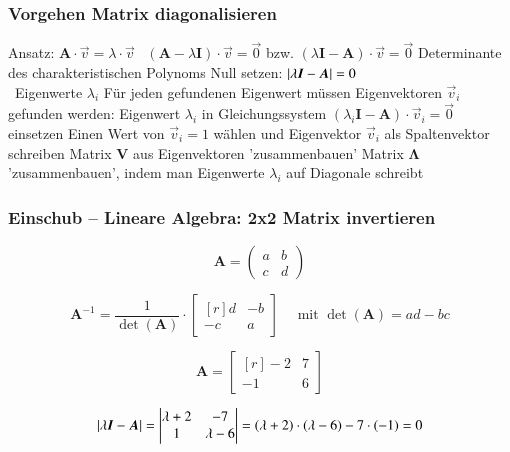 \subsubsection{Vorgehen Matrix diagonalisieren}

\begin{outline}
    \1 Ansatz: $ \bm{A} \cdot \vec{v} = \lambda \cdot \vec{v}$ \textrightarrow\ $(\bm{A} - \lambda \bm{I}) \cdot \vec{v} = \vec{0}$ bzw. 
        $(\lambda \bm{I} - \bm{A}) \cdot \vec{v} = \vec{0}$
    \1 Determinante des charakteristischen Polynoms Null setzen: $\left|\lambda \bm{I} - \bm{A}\right| = 0$ \\
        \textrightarrow\ Eigenwerte $\lambda_i$ 
    \1 Für jeden gefundenen Eigenwert müssen Eigenvektoren $\vec{v}_i$ gefunden werden:
        \2 Eigenwert $\lambda_i$ in Gleichungssystem $(\lambda_i \bm{I} - \bm{A}) \cdot \vec{v}_i = \vec{0}$ einsetzen
        \2 Einen Wert von $\vec{v}_i = 1$ wählen und Eigenvektor $\vec{v}_i$ als Spaltenvektor schreiben
    \1 Matrix $\bm{V}$ aus Eigenvektoren 'zusammenbauen'
    \1 Matrix $\bm{\Lambda}$ 'zusammenbauen', indem man Eigenwerte $\lambda_i$ auf Diagonale schreibt
\end{outline}


\subsubsection{Einschub -- Lineare Algebra: 2x2 Matrix invertieren}

\begin{minipage}[b]{0.33\columnwidth}
    $$ \bm{A} = 
    \begin{pmatrix}
        a & b \\
        c & d 
    \end{pmatrix} $$
\end{minipage}
\hfill
\begin{minipage}[b]{0.66\columnwidth}
    $$ \bm{A}^{-1} = \frac{1}{\det(\bm{A})} \cdot 
    \begin{bmatrix*}[r]
        d & -b \\
        -c & a 
    \end{bmatrix*} \quad \text{ mit } \det(\bm{A}) = ad - bc $$
\end{minipage}



\begin{minipage}[c]{0.25\columnwidth}
    $$ \bm{A} = \begin{bmatrix*}[r]
        -2 & 7 \\
        -1 & 6 
    \end{bmatrix*}$$ 
\end{minipage}
\hfill
\begin{minipage}[c]{0.72\columnwidth}
    $$ \abs{\lambda \bm{I} - \bm{A}} = \begin{vmatrix*}[c]
        \lambda + 2 & -7 \\
        1 & \lambda - 6 
    \end{vmatrix*} = (\lambda + 2) \cdot (\lambda - 6) - 7 \cdot (-1) = 0 $$
\end{minipage}

